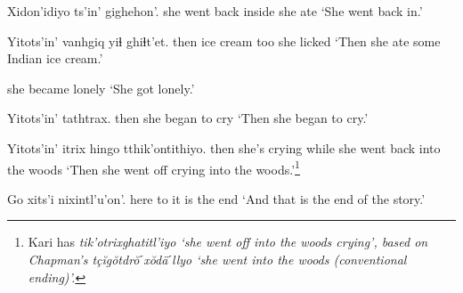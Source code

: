 \documentclass[12pt]{article}
\begin{document}
\gll Xidon'idiyo ts'in' gighehon'.
{she went back inside} {} {she ate}
\glt `She went back in.'
\glend

\gll Yitots'in' vanhgiq yiɬ ghiɬt'et.
then {ice cream} too {she licked}
\glt `Then she ate some Indian ice cream.'
\glend

{{she became lonely}}
\glt `She got lonely.'
\glend

\gll Yitots'in' tathtrax.
then {she began to cry}
\glt `Then she began to cry.'
\glend

\gll Yitots'in' itrix hingo tthik'ontithiyo.
then {she's crying} while {she went back into the woods}
\glt `Then she went off crying into the woods.'\footnote{Kari has \em tik'otrixghatitl'iyo \em `she went off into the woods crying', based on Chapman's \em t\c{c}\u{i}g\u{o}tdr\u{o}ˊx\u{o}d\"aˊllyo \em `she went into the woods (conventional ending)'.}
\glend

\gll Go xits'i nixintl'u'on'.
here to {it is the end}
\glt `And that is the end of the story.'
\glend
\end{document}
